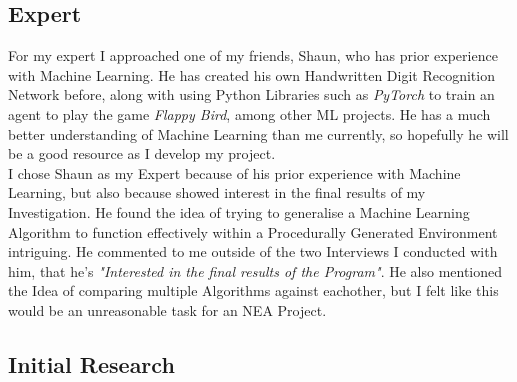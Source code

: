 \begin{flushleft}
        \subsection{Expert}
            \vspace{0.2cm}
            For my expert I approached one of my friends, Shaun, who has prior experience with Machine Learning. He has
            created his own Handwritten Digit Recognition Network before, along with using Python Libraries such as 
            \textit{PyTorch} to train an agent to play the game \textit{Flappy Bird}, among other ML projects. He has 
            a much better understanding of Machine Learning than me currently, so hopefully he will be a good resource 
            as I develop my project. \\
            \vspace{0.2cm}    
            I chose Shaun as my Expert because of his prior experience with Machine Learning, but also because showed interest
            in the final results of my Investigation. He found the idea of trying to generalise a Machine Learning Algorithm
            to function effectively within a Procedurally Generated Environment intriguing. He commented to me outside of the
            two Interviews I conducted with him, that he's \textit{"Interested in the final results of the Program"}. He also
            mentioned the Idea of comparing multiple Algorithms against eachother, but I felt like this would be an unreasonable
            task for an NEA Project. \\
            \vspace{0.2cm}    
        \subsection{Initial Research}

\end{flushleft}
